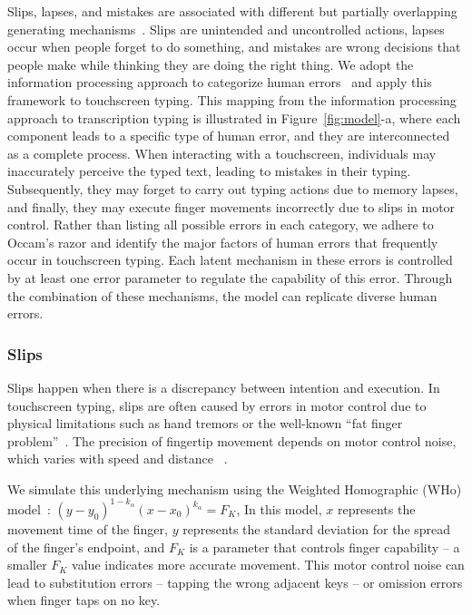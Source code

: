 Slips, lapses, and mistakes are associated with different but partially overlapping generating mechanisms~\cite{reason1990human}. 
Slips are unintended and uncontrolled actions, lapses occur when people forget to do something, and mistakes are wrong decisions that people make while thinking they are doing the right thing. 
We adopt the information processing approach to categorize human errors~\cite{wickens2021engineering} and apply this framework to touchscreen typing. 
This mapping from the information processing approach to transcription typing is illustrated in Figure~\ref{fig:model}-a, where each component leads to a specific type of human error, and they are interconnected as a complete process. 
%
When interacting with a touchscreen, individuals may inaccurately perceive the typed text, leading to mistakes in their typing. Subsequently, they may forget to carry out typing actions due to memory lapses, and finally, they may execute finger movements incorrectly due to slips in motor control. Rather than listing all possible errors in each category, we adhere to Occam's razor and identify the major factors of human errors that frequently occur in touchscreen typing. Each latent mechanism in these errors is controlled by at least one error parameter to regulate the capability of this error. Through the combination of these mechanisms, the model can replicate diverse human errors.

\subsubsection{Slips}

Slips happen when there is a discrepancy between intention and execution. In touchscreen typing, slips are often caused by errors in motor control due to physical limitations such as hand tremors or the well-known ``fat finger problem''~\cite{siek2005fat}.
The precision of fingertip movement depends on motor control noise, which varies with speed and distance ~\cite{fitts1954information}.

We simulate this underlying mechanism using the Weighted Homographic (WHo) model~\cite{guiard2015mathematical}: $(y-y_0)^{1-k_\alpha}(x-x_0)^{k_\alpha} = F_K$,
In this model, $x$ represents the movement time of the finger, $y$ represents the standard deviation for the spread of the finger's endpoint, and $F_K$ is a parameter that controls finger capability – a smaller $F_K$ value indicates more accurate movement. This motor control noise can lead to substitution errors – tapping the wrong adjacent keys – or omission errors when finger taps on no key. 

